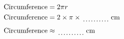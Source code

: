 \documentclass[12pt]{article}
\begin{document}
\hfill
\begin{minipage}{0.45\textwidth}
  \begin{align*}
  \text{Circumference} &= 2\pi r \\
  \text{Circumference} &= 2 \times \pi \times \dotuline{~~~~~~~~~~~~}\,\text{cm} \\
  \text{Circumference} &\approx \dotuline{~~~~~~~~~~~~} \,\text{cm}
  \end{align*}
\end{minipage}
\par\vspace{1cm}
\end{document}
